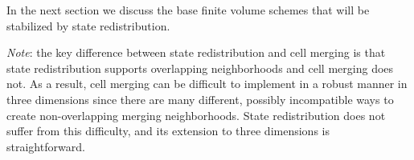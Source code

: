 In the next section  we discuss the base finite volume schemes that will be stabilized by state redistribution.

\textit{Note}: the key difference between state redistribution and cell merging is that state redistribution supports overlapping neighborhoods and cell merging does not. 
As a result, cell merging can be difficult to implement in a robust manner in three dimensions since there are many different, possibly incompatible ways to create non-overlapping merging neighborhoods.
State redistribution does not suffer from this difficulty, and its extension to three dimensions is straightforward.













